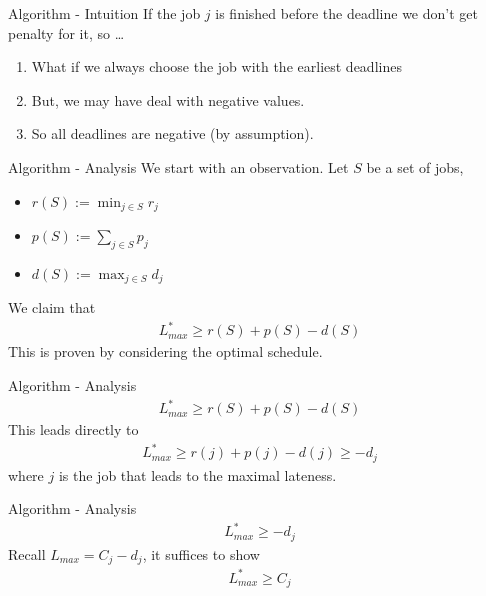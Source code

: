 \documentclass{beamer}
\begin{document}
\begin{frame}{Algorithm - Intuition}
    If the job $j$ is finished before the deadline we don't get penalty for it, so \dots 
    \begin{enumerate}
        \item<1-> What if we always choose the job with the earliest deadlines 
        \item<2-> But, we may have deal with negative values. 
        \item<3> So all deadlines are negative (by assumption).
    \end{enumerate}
\end{frame}

\begin{frame}{Algorithm - Analysis}
    We start with an observation. 
    Let $S$ be a set of jobs,
    \begin{itemize}
        \item $r(S) := \min_{j \in S} r_j$ 
        \item $p(S) := \sum_{j \in S} p_j$ 
        \item $d(S) := \max_{j \in S} d_j$
    \end{itemize}
    We claim that
    \begin{align*}
        L_{max}^* \geq r(S) + p(S) - d(S)
    \end{align*}
    This is proven by considering the optimal schedule.
\end{frame}

\begin{frame}{Algorithm - Analysis}
    \begin{align*}
        L_{max}^* \geq r(S) + p(S) - d(S)
    \end{align*}
    This leads directly to 
    \begin{align*}
        L_{max}^* \geq r({j}) + p({j}) - d({j}) \geq -d_j
    \end{align*}
    where $j$ is the job that leads to the maximal lateness. 
\end{frame}

\begin{frame}{Algorithm - Analysis}
    \begin{align*}
        L_{max}^* \geq -d_j
    \end{align*}
    Recall $L_{max} = C_j - d_j$, it suffices to show
    \begin{align*}
        L_{max}^* \geq C_j
    \end{align*}
\end{frame}
\end{document}
